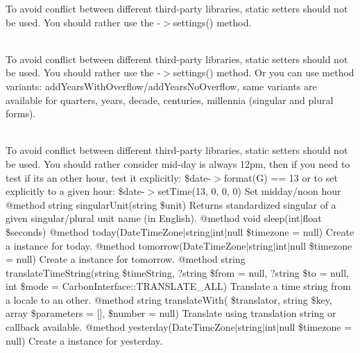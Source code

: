 \begin{DoxyRefList}
\label{deprecated__deprecated000142}%
%
To avoid conflict between different third-\/party libraries, static setters should not be used. You should rather use the -\/\texorpdfstring{$>$}{>}settings() method.  
\item[Member \doxylink{interface_carbon_1_1_carbon_interface_a09682daf25c99fe71eee0eb570893772}{Carbon\textbackslash{}Carbon\+Interface\+::use\+Years\+Overflow} (bool \$years\+Overflow=true)]\hfill \\
\label{deprecated__deprecated000143}%
%
To avoid conflict between different third-\/party libraries, static setters should not be used. You should rather use the -\/\texorpdfstring{$>$}{>}settings() method. Or you can use method variants\+: add\+Years\+With\+Overflow/add\+Years\+No\+Overflow, same variants are available for quarters, years, decade, centuries, millennia (singular and plural forms).  
\item[Class \doxylink{class_carbon_1_1_factory}{Carbon\textbackslash{}Factory} ]\hfill \\
\label{deprecated__deprecated000144}%
%
To avoid conflict between different third-\/party libraries, static setters should not be used. You should rather consider mid-\/day is always 12pm, then if you need to test if it\textquotesingle{}s an other hour, test it explicitly\+: \$date-\/\texorpdfstring{$>$}{>}format(\textquotesingle{}G\textquotesingle{}) == 13 or to set explicitly to a given hour\+: \$date-\/\texorpdfstring{$>$}{>}set\+Time(13, 0, 0, 0) Set midday/noon hour @method string singular\+Unit(string \$unit) Returns standardized singular of a given singular/plural unit name (in English). @method void sleep(int\texorpdfstring{$\vert$}{|}float \$seconds) @method  today(Date\+Time\+Zone\texorpdfstring{$\vert$}{|}string\texorpdfstring{$\vert$}{|}int\texorpdfstring{$\vert$}{|}null \$timezone = null) Create a  instance for today. @method  tomorrow(Date\+Time\+Zone\texorpdfstring{$\vert$}{|}string\texorpdfstring{$\vert$}{|}int\texorpdfstring{$\vert$}{|}null \$timezone = null) Create a  instance for tomorrow. @method string translate\+Time\+String(string \$time\+String, ?string \$from = null, ?string \$to = null, int \$mode = Carbon\+Interface\+::\+TRANSLATE\+\_\+\+ALL) Translate a time string from a locale to an other. @method string translate\+With( \$translator, string \$key, array \$parameters = \mbox{[}\mbox{]}, \$number = null) Translate using translation string or callback available. @method  yesterday(Date\+Time\+Zone\texorpdfstring{$\vert$}{|}string\texorpdfstring{$\vert$}{|}int\texorpdfstring{$\vert$}{|}null \$timezone = null) Create a  instance for yesterday. 

\end{DoxyRefList}
